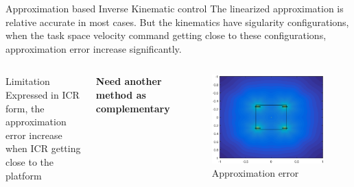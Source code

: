 \documentclass[10pt]{beamer}
\begin{document}
\begin{frame}{Approximation based Inverse Kinematic control}
The linearized approximation is relative accurate in most cases. But the kinematics have sigularity configurations, when 
the task space velocity command getting close to these configurations, approximation error increase significantly.
\begin{columns}
  \begin{block}{Limitation}
  Expressed in ICR form, the approximation error increase when ICR getting close to the platform
  \end{block}
  \textbf{Need another method as complementary}
    \begin{figure}
        \centering
        \includegraphics[width=\textwidth]{Figure/approximationError.eps}
        \caption{Approximation error}
        \label{fig:appError}
    \end{figure}
\end{columns}

\end{frame}
\end{document}
